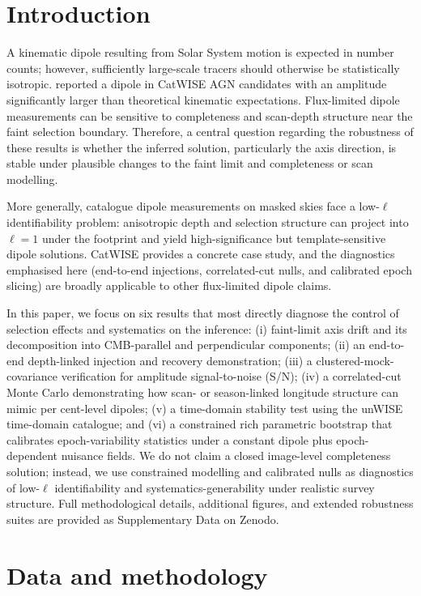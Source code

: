 \documentclass[fleqn,usenatbib]{mnras}
\begin{document}
\section{Introduction}
A kinematic dipole resulting from Solar System motion is expected in number counts; however, sufficiently large-scale tracers should otherwise be statistically isotropic.
\citet{secrest2022} reported a dipole in CatWISE AGN candidates with an amplitude significantly larger than theoretical kinematic expectations.
Flux-limited dipole measurements can be sensitive to completeness and scan-depth structure near the faint selection boundary.
Therefore, a central question regarding the robustness of these results is whether the inferred solution, particularly the axis direction, is stable under plausible changes to the faint limit and completeness or scan modelling.

More generally, catalogue dipole measurements on masked skies face a low-$\ell$ identifiability problem: anisotropic depth and selection structure can project into $\ell=1$ under the footprint and yield high-significance but template-sensitive dipole solutions.
CatWISE provides a concrete case study, and the diagnostics emphasised here (end-to-end injections, correlated-cut nulls, and calibrated epoch slicing) are broadly applicable to other flux-limited dipole claims.

In this paper, we focus on six results that most directly diagnose the control of selection effects and systematics on the inference: (i) faint-limit axis drift and its decomposition into CMB-parallel and perpendicular components; (ii) an end-to-end depth-linked injection and recovery demonstration; (iii) a clustered-mock-covariance verification for amplitude signal-to-noise (S/N); (iv) a correlated-cut Monte Carlo demonstrating how scan- or season-linked longitude structure can mimic per cent-level dipoles; (v) a time-domain stability test using the unWISE time-domain catalogue; and (vi) a constrained rich parametric bootstrap that calibrates epoch-variability statistics under a constant dipole plus epoch-dependent nuisance fields.
We do not claim a closed image-level completeness solution; instead, we use constrained modelling and calibrated nulls as diagnostics of low-$\ell$ identifiability and systematics-generability under realistic survey structure.
Full methodological details, additional figures, and extended robustness suites are provided as Supplementary Data on Zenodo.

\section{Data and methodology}
\end{document}
